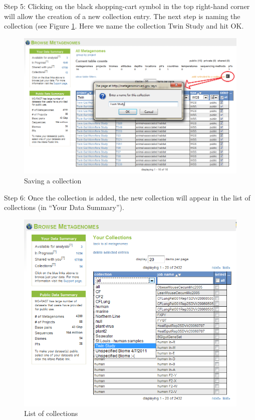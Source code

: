 \documentclass[12pt,fullpage]{report}
\begin{document}
Step 5: Clicking on the black shopping-cart symbol in the top right-hand corner will allow the creation of a new collection entry. The next step is naming the collection (see Figure \ref{fig:Collections-how-to-save}.
Here we name the collection Twin Study and hit OK.

\begin{figure}[ht]
\begin{center}
\includegraphics[width=6in]{Images/Collections-how-to-save.png}
\end{center}
\caption{
Saving a collection}
\label{fig:Collections-how-to-save}
\end{figure}

Step 6: Once the collection is added, the new collection will appear in the list of collections (in ``Your Data Summary'').

\begin{figure}[ht]
\begin{center}
\includegraphics[width=6in]{Images/collections-finished.png}
\end{center}
\caption{
List of collections}
\label{fig:collections-finished}
\end{figure}
\end{document}
